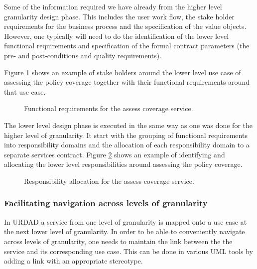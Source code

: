 \documentclass{IOS-Book-Article}
\begin{document}
Some of the information required we have already from the higher level granularity design phase.
This includes the user work flow, the stake holder requirements for the business process and
the specification of the value objects. However, one typically will need to do the 
identification of the lower level functional requirements and  specification of the 
formal contract parameters (the pre- and post-conditions and quality requirements).

Figure \ref{fig:assessCoverageFunctionalRequirements} shows an example of stake holders around
the lower level use case of assessing the policy coverage together with their functional requirements
around that use case.

\begin{figure}[htb]
  \centering
  \caption{Functional requirements for the assess coverage service.}
  \label{fig:assessCoverageFunctionalRequirements}
\end{figure}


The lower level design phase is executed in the same way as one was done for the higher level of granularity.
It start with the grouping of functional requirements into responsibility domains and the allocation of
each responsibility domain to a separate services contract. Figure \ref{fig:assessCoverageResponsibilityAllocation}
shows an example of identifying and allocating the lower level responsibilities around assessing the
policy coverage.

\begin{figure}[htb]
  \centering
  \caption{Responsibility allocation for the assess coverage service.}
  \label{fig:assessCoverageResponsibilityAllocation}
\end{figure}


\subsubsection{Facilitating navigation across levels of granularity}

In URDAD a service from one level of granularity is mapped onto a use case at the next lower
level of granularity. In order to be able to conveniently navigate across levels of granularity,
one needs to maintain the link between the the service and its corresponding use case. This can
be done in various UML tools by adding a link with an appropriate stereotype.
\end{document}
